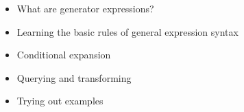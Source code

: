 \begin{itemize}
\item
What are generator expressions?

\item
Learning the basic rules of general expression syntax

\item
Conditional expansion

\item
Querying and transforming

\item
Trying out examples
\end{itemize}

































